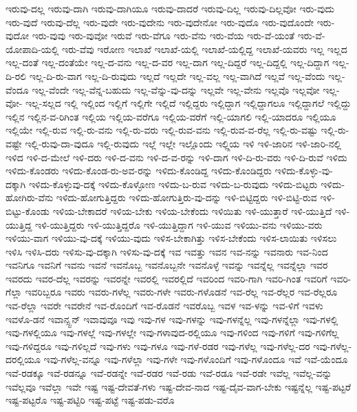 {ಇರುವು-ದಲ್ಲ
ಇರುವು-ದಾಗಿ
ಇರುವು-ದಾಗಿಯೂ
ಇರುವು-ದಾದರೆ
ಇರುವು-ದಿಲ್ಲ
ಇರುವು-ದಿಲ್ಲವೋ
ಇರು-ವುದು
ಇರು-ವುದೆ
ಇರುವು-ದೆಲ್ಲ
ಇರು-ವುದೇ
ಇರು-ವುದೇನು
ಇರು-ವುದೇನೋ
ಇರು-ವುದೊ
ಇರು-ವುದೊಂದೇ
ಇರು-ವುದೋ
ಇರು-ವುವು
ಇರು-ವುವೋ
ಇರುವೆ
ಇರು-ವೆಗೂ
ಇರು-ವೆನು
ಇರು-ವೆಯ
ಇರು-ವೆ-ಯಂತೆ
ಇರು-ವೆ-ಯೋಪಾದಿ-ಯಲ್ಲಿ
ಇರು-ವೆವು
ಇರೋಣ
ಇಲಾಖೆ
ಇಲಾಖೆ-ಯಲ್ಲಿ
ಇಲಾಖೆ-ಯಲ್ಲಿದ್ದ
ಇಲಾಖೆ-ಯವರು
ಇಲ್ಲ
ಇಲ್ಲದ
ಇಲ್ಲ-ದಂತೆ
ಇಲ್ಲ-ದಂತೆಯೇ
ಇಲ್ಲ-ದ-ವನು
ಇಲ್ಲ-ದ-ವರ
ಇಲ್ಲ-ದಾಗ
ಇಲ್ಲ-ದಿದ್ದರೆ
ಇಲ್ಲ-ದಿದ್ದಲ್ಲಿ
ಇಲ್ಲ-ದಿದ್ದಾಗ
ಇಲ್ಲ-ದಿ-ರಲಿ
ಇಲ್ಲ-ದಿ-ರು-ವಾಗ
ಇಲ್ಲ-ದಿ-ರುವುದು
ಇಲ್ಲದೆ
ಇಲ್ಲದೇ
ಇಲ್ಲ-ವಲ್ಲ
ಇಲ್ಲ-ವಾಗಿದೆ
ಇಲ್ಲವೆ
ಇಲ್ಲ-ವೆಂದು
ಇಲ್ಲ-ವೆಂದೂ
ಇಲ್ಲ-ವೆಂದೇ
ಇಲ್ಲ-ವೆನ್ನ-ಬಹುದು
ಇಲ್ಲ-ವೆನ್ನು-ವು-ದನ್ನು
ಇಲ್ಲವೇ
ಇಲ್ಲ-ವೇನು
ಇಲ್ಲವೊ
ಇಲ್ಲವೋ
ಇಲ್ಲ-ವೋ-
ಇಲ್ಲ-ಸಲ್ಲದ
ಇಲ್ಲಿ
ಇಲ್ಲಿಂದ
ಇಲ್ಲಿಗೆ
ಇಲ್ಲಿಗೇ
ಇಲ್ಲಿದೆ
ಇಲ್ಲಿದ್ದರು
ಇಲ್ಲಿದ್ದಾಗ
ಇಲ್ಲಿದ್ದಾಗಲೂ
ಇಲ್ಲಿದ್ದಾಗಲೆ
ಇಲ್ಲಿದ್ದು
ಇಲ್ಲಿನ
ಇಲ್ಲಿನ-ವ-ರಿಗಿಂತ
ಇಲ್ಲಿಯ
ಇಲ್ಲಿಯ-ವರೆಗೂ
ಇಲ್ಲಿಯ-ವರೆಗೆ
ಇಲ್ಲಿ-ಯಾಗಲಿ
ಇಲ್ಲಿ-ಯಾದರೂ
ಇಲ್ಲಿಯೂ
ಇಲ್ಲಿಯೇ
ಇಲ್ಲಿ-ರುವ
ಇಲ್ಲಿ-ರು-ವನು
ಇಲ್ಲಿ-ರು-ವರು
ಇಲ್ಲಿ-ರುವ-ವನು
ಇಲ್ಲಿ-ರುವ-ವ-ರೆಲ್ಲ
ಇಲ್ಲಿ-ರು-ವಷ್ಟು
ಇಲ್ಲಿ-ರು-ವಷ್ಟೇ
ಇಲ್ಲಿ-ರುವು-ದಾ-ವುದೂ
ಇಲ್ಲಿ-ರುವುದು
ಇಲ್ಲೆ
ಇಲ್ಲೇ
ಇಲ್ಲೊಂದು
ಇಲ್ಲ್ಲಿಯ
ಇಳಿ
ಇಳಿ-ಜಾರಿನ
ಇಳಿ-ಜಾರಿ-ನಲ್ಲಿ
ಇಳಿದ
ಇಳಿ-ದ-ಮೇಲೆ
ಇಳಿ-ದರು
ಇಳಿ-ದ-ವನು
ಇಳಿ-ದ-ವ-ರನ್ನು
ಇಳಿ-ದಾಗ
ಇಳಿ-ದಿ-ರು-ವರು
ಇಳಿ-ದಿ-ರುವೆ
ಇಳಿದು
ಇಳಿದು-ಕೊಂಡರು
ಇಳಿದು-ಕೊಂಡ-ರು-ಅವ-ರನ್ನು
ಇಳಿದು-ಕೊಂಡಿದ್ದ
ಇಳಿದು-ಕೊಂಡಿದ್ದರು
ಇಳಿದು-ಕೊಳ್ಳು-ವು-ದಕ್ಕಾಗಿ
ಇಳಿದು-ಕೊಳ್ಳುವು-ದಕ್ಕೆ
ಇಳಿದು-ಕೊಳ್ಳೋಣ
ಇಳಿದು-ಬ-ರುವ
ಇಳಿದು-ಬ-ರುವುದು
ಇಳಿದು-ಬಿಟ್ಟರು
ಇಳಿದು-ಹೋಗಿರು-ವೆನು
ಇಳಿದು-ಹೋಗುತ್ತಿದ್ದರು
ಇಳಿದು-ಹೋಗುತ್ತಿರು-ವು-ದನ್ನು
ಇಳಿ-ಬಿಟ್ಟಿದ್ದರು
ಇಳಿ-ಬಿಟ್ಟಿ-ರುವ
ಇಳಿ-ಬಿಟ್ಟು-ಕೊಂಡು
ಇಳಿಯ-ಬೇಕಾದರೆ
ಇಳಿಯ-ಬೇಕು
ಇಳಿಯ-ಬೇಕೆಂದು
ಇಳಿಯಿತು
ಇಳಿ-ಯುತ್ತಾರೆ
ಇಳಿ-ಯುತ್ತಿದೆ
ಇಳಿ-ಯುತ್ತಿದ್ದ
ಇಳಿ-ಯುತ್ತಿದ್ದರು
ಇಳಿ-ಯುತ್ತಿದ್ದರೊ
ಇಳಿ-ಯುತ್ತಿದ್ದಾಗ
ಇಳಿ-ಯುವ
ಇಳಿಯು-ವನು
ಇಳಿಯು-ವರು
ಇಳಿಯು-ವಾಗ
ಇಳಿಯು-ವು-ದಕ್ಕೆ
ಇಳಿಯು-ವುದು
ಇಳಿಸ-ಬೇಕಾಗಿತ್ತು
ಇಳಿಸ-ಬೇಕೆಂದು
ಇಳಿಸ-ಲಾಯಿತು
ಇಳಿಸಲು
ಇಳಿಸಿ
ಇಳಿಸಿ-ದರು
ಇಳಿಸು-ವು-ದಕ್ಕಾಗಿ
ಇಳಿಸು-ವು-ದಕ್ಕೆ
ಇವ
ಇವತ್ತು
ಇವನ
ಇವ-ನನ್ನು
ಇವನಾರು
ಇವ-ನಿಂದ
ಇವನಿಗೂ
ಇವನಿಗೆ
ಇವನು
ಇವನೆ
ಇವನೊಬ್ಬ
ಇವನೊಬ್ಬನೇ
ಇವನೊಳ್ಳೆ
ಇವನ್ನು
ಇವನ್ನೆಲ್ಲ
ಇವನ್ನೆಲ್ಲಾ
ಇವರ
ಇವರದು
ಇವರ-ದೆಲ್ಲ
ಇವರನ್ನು
ಇವರನ್ನೇ
ಇವರಲ್ಲಿ
ಇವರಲ್ಲಿದೆ
ಇವರಿಂದ
ಇವರಿ-ಗಾಗಿ
ಇವರಿ-ಗಿಂತ
ಇವರಿಗೆ
ಇವರಿ-ಗೆಲ್ಲಾ
ಇವರಿಬ್ಬರೂ
ಇವರು
ಇವರು-ಗಳೆಲ್ಲ
ಇವರು-ಗಳೇ
ಇವರು-ಗಳೊಡನೆ
ಇವ-ರೆಲ್ಲ
ಇವ-ರೆಲ್ಲರ
ಇವ-ರೆಲ್ಲರೂ
ಇವ-ರೆಲ್ಲಾ
ಇವರೇ
ಇವರೇನೆ
ಇವ-ರೊಂದಿಗೆ
ಇವ-ರೊಡನೆ
ಇವರೊಬ್ಬ
ಇವಳ
ಇವ-ಳನ್ನು
ಇವ-ಳಿಗೆ
ಇವಳು
ಇವಳೊ-ಡನೆ
ಇವಾನ್ಸ್ಟನ್
ಇವಾವುವೂ
ಇವು
ಇವು-ಗಳ
ಇವು-ಗಳನ್ನು
ಇವು-ಗಳನ್ನೆಲ್ಲ
ಇವು-ಗಳನ್ನೆಲ್ಲಾ
ಇವು-ಗಳಲ್ಲಿ
ಇವು-ಗಳಲ್ಲಿಯೂ
ಇವು-ಗಳಲ್ಲೆ
ಇವು-ಗಳಲ್ಲೇ
ಇವು-ಗಳಾವುದ-ರಲ್ಲಿಯೂ
ಇವು-ಗಳಿಂದ
ಇವು-ಗಳಿಗೆ
ಇವು-ಗಳಿಗೆಲ್ಲ
ಇವು-ಗಳಿದ್ದರೂ
ಇವು-ಗಳಿಲ್ಲದೆ
ಇವು-ಗಳು
ಇವು-ಗಳೂ
ಇವು-ಗಳೆ-ರಡರ
ಇವು-ಗಳೆಲ್ಲ
ಇವು-ಗಳೆಲ್ಲ-ದರ
ಇವು-ಗಳೆಲ್ಲ-ದರಲ್ಲಿಯೂ
ಇವು-ಗಳೆಲ್ಲ-ವನ್ನೂ
ಇವು-ಗಳೆಲ್ಲಾ
ಇವು-ಗಳೇ
ಇವು-ಗಳೊಂದಿಗೆ
ಇವು-ಗಳೊಂದೂ
ಇವೆ
ಇವೆ-ಯೆಂದೂ
ಇವೆ-ರಡಕ್ಕೂ
ಇವೆ-ರಡನ್ನೂ
ಇವೆ-ರಡನ್ನೇ
ಇವೆ-ರಡರ
ಇವೆ-ರಡು
ಇವೆ-ರಡೂ
ಇವೆ-ರಡೇ
ಇವೆಲ್ಲ
ಇವೆಲ್ಲ-ವನ್ನು
ಇವೆಲ್ಲವೂ
ಇವೆಲ್ಲಾ
ಇವೇ
ಇಷ್ಟ
ಇಷ್ಟ-ದೇವತೆ-ಗಳು
ಇಷ್ಟ-ದೇವ-ನಾದ
ಇಷ್ಟ-ದೈವ-ವಾಗ-ಬೇಕು
ಇಷ್ಟನ್ನೆಲ್ಲ
ಇಷ್ಟ-ಪಟ್ಟರೆ
ಇಷ್ಟ-ಪಟ್ಟರೊ
ಇಷ್ಟ-ಪಟ್ಟಿರಿ
ಇಷ್ಟ-ಪಟ್ಟೆ
ಇಷ್ಟ-ಪಡು-ವರೊ
}
